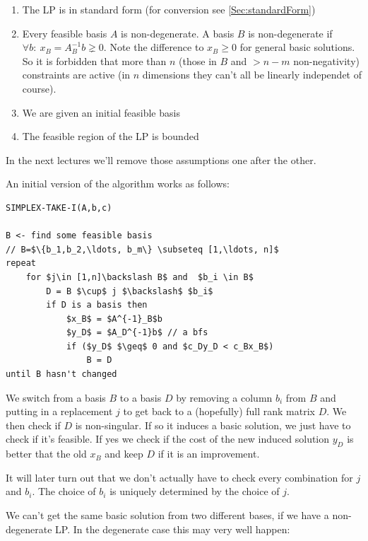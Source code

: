 \begin{enumerate}
\item The LP is in standard form (for conversion see \ref{Sec:standardForm})
\item Every feasible basis $A$ is non-degenerate. A basis $B$ is non-degenerate if $\forall b:\ x_B=A^{-1}_Bb \gneq 0$. Note the difference to $x_B\geq 0$ for general basic solutions. So it is forbidden that more than $n$ (those in $B$ and $>n-m$ non-negativity) constraints are active (in $n$ dimensions they can't all be linearly independet of course). 
\item We are given an initial feasible basis
\item The feasible region of the LP is bounded
\end{enumerate}

In the next lectures we'll remove those assumptions one after the other.

An initial version of the algorithm works as follows:
\begin{center}
\begin{lstlisting}
SIMPLEX-TAKE-I(A,b,c)

B <- find some feasible basis
// B=$\{b_1,b_2,\ldots, b_m\} \subseteq [1,\ldots, n]$
repeat 
    for $j\in [1,n]\backslash B$ and  $b_i \in B$
        D = B $\cup$ j $\backslash$ $b_i$
        if D is a basis then
            $x_B$ = $A^{-1}_B$b
            $y_D$ = $A_D^{-1}b$ // a bfs
            if ($y_D$ $\geq$ 0 and $c_Dy_D < c_Bx_B$)
                B = D
until B hasn't changed                
\end{lstlisting}
\end{center}

We switch from a basis $B$ to a basis $D$ by removing a column $b_i$ from $B$ and putting in a replacement $j$ to get back to a (hopefully) full rank matrix $D$. We then check if $D$ is non-singular. If so it induces a basic solution, we just have to check if it's feasible. If yes we check if the cost of the new induced solution $y_D$ is better that the old $x_B$ and keep $D$ if it is an improvement.

It will later turn out that we don't actually have to check every combination for $j$ and $b_i$. The choice of $b_i$ is uniquely determined by the choice of $j$.

We can't get the same basic solution from two different bases, if we have a non-degenerate LP. In the degenerate case this may very well happen:

